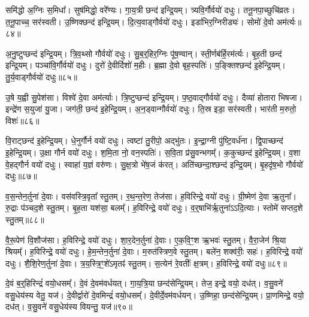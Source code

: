 समि॑द्धो अ॒ग्निः स॒मिधा᳚।
सुष॑मिद्धो॒ वरे᳚ण्यः।
गा॒य॒त्री छन्द॑ इन्द्रि॒यम्।
त्र्यवि॒र्गौर्वयो॑ दधुः।
तनू॒नपा॒च्छुचि॑व्रतः।
त॒नू॒पाच्च॒ सर॑स्वती।
उ॒ष्णिक्छन्द॑ इन्द्रि॒यम्।
दि॒त्य॒वाड्गौर्वयो॑ दधुः।
इडा॑भिर॒ग्निरीड्यः॑।
सोमो॑ दे॒वो अम॑र्त्यः॥८४॥\ip

अ॒नु॒ष्टुप्छन्द॑ इन्द्रि॒यम्।
त्रि॒व॒थ्सो गौर्वयो॑ दधुः।
सु॒ब॒र्॒हिर॒ग्निः पू॑ष॒ण्वान्।
स्ती॒र्णब॑र्हि॒रम॑र्त्यः।
बृ॒ह॒ती छन्द॑ इन्द्रि॒यम्।
पञ्चा॑वि॒र्गौर्वयो॑ दधुः।
दुरो॑ दे॒वीर्दिशो॑ म॒हीः।
ब्र॒ह्मा दे॒वो बृह॒स्पतिः॑।
प॒ङ्क्तिश्छन्द॑ इ॒हेन्द्रि॒यम्।
तु॒र्य॒वाड्गौर्वयो॑ दधुः॥८५॥\ip

उ॒षे य॒ह्वी सु॒पेश॑सा।
विश्वे॑ दे॒वा अम॑र्त्याः।
त्रि॒ष्टुप्छन्द॑ इन्द्रि॒यम्।
प॒ष्ठ॒वाद्गौर्वयो॑ दधुः।
दैव्या॑ होतारा भिषजा।
इन्द्रे॑ण स॒युजा॑ यु॒जा।
जग॑ती॒ छन्द॑ इ॒हेन्द्रि॒यम्।
अ॒न॒ड्वान्गौर्वयो॑ दधुः।
ति॒स्र इडा॒ सर॑स्वती।
भार॑ती म॒रुतो॒ विशः॑॥८६॥\ip

वि॒राट्छन्द॑ इ॒हेन्द्रि॒यम्।
धे॒नुर्गौर्न वयो॑ दधुः।
त्वष्टा॑ तु॒रीपो॒ अद्भु॑तः।
इ॒न्द्रा॒ग्नी पु॑ष्टि॒वर्ध॑ना।
द्वि॒पाच्छन्द॑ इ॒हेन्द्रि॒यम्।
उ॒क्षा गौर्न वयो॑ दधुः।
श॒मि॒ता नो॒ वन॒स्पतिः॑।
स॒वि॒ता प्र॑सु॒वन्भगम्᳚।
क॒कुच्छन्द॑ इ॒हेन्द्रि॒यम्।
व॒शा वे॒हद्गौर्न वयो॑ दधुः।
स्वाहा॑ य॒ज्ञं वरु॑णः।
सु॒क्ष॒त्रो भे॑ष॒जं क॑रत्।
अति॑च्छन्दा॒श्छन्द॑ इन्द्रि॒यम्।
बृ॒हदृ॑ष॒भो गौर्वयो॑ दधुः॥८७॥\ip\anuvakamend[अम॑र्त्यस्तुर्य॒वाड्गौर्वयो॑ दधु॒र्विशो॑ व॒शा वे॒हद्गौर्न वयो॑ दधुश्च॒त्वारि॑ च]

व॒स॒न्तेन॒र्तुना॑ दे॒वाः।
वस॑वस्त्रि॒वृता᳚ स्तु॒तम्।
र॒थ॒न्त॒रेण॒ तेज॑सा।
ह॒विरिन्द्रे॒ वयो॑ दधुः।
ग्री॒ष्मेण॑ दे॒वा ऋ॒तुना᳚।
रु॒द्राः प॑ञ्चद॒शे स्तु॒तम्।
बृ॒ह॒ता यश॑सा॒ बलम्᳚।
ह॒विरिन्द्रे॒ वयो॑ दधुः।
व॒र्॒षाभि॑र्\mbox{}ऋ॒तुना॑\-ऽऽदि॒त्याः।
स्तोमे॑ सप्तद॒शे स्तु॒तम्॥८८॥\ip

वै॒रू॒पेण॑ वि॒शौज॑सा।
ह॒विरिन्द्रे॒ वयो॑ दधुः।
शा॒र॒देन॒र्तुना॑ दे॒वाः।
ए॒क॒वि॒ꣳ॒श ऋ॒भवः॑ स्तु॒तम्।
वै॒रा॒जेन॑ श्रि॒या श्रियम्᳚।
ह॒विरिन्द्रे॒ वयो॑ दधुः।
हे॒म॒न्तेन॒र्तुना॑ दे॒वाः।
म॒रुत॑स्त्रिण॒वे स्तु॒तम्।
बले॑न॒ शक्व॑रीः॒ सहः॑।
ह॒विरिन्द्रे॒ वयो॑ दधुः।
शै॒शि॒रेण॒र्तुना॑ दे॒वाः।
त्र॒य॒स्त्रि॒ꣳ॒शे॑\-ऽमृतꣴ॑ स्तु॒तम्।
स॒त्येन॑ रे॒वतीः᳚ क्ष॒त्रम्।
ह॒विरिन्द्रे॒ वयो॑ दधुः॥८९॥\ip\anuvakamend[स्तोमे॑ सप्तद॒शे स्तु॒तꣳ सहो॑ ह॒विरिन्द्रे॒ वयो॑ दधुश्च॒त्वारि॑ च (व॒स॒न्तेन॑ ग्री॒ष्मेण॑ व॒र्‌॒\mbox{}षाभिः॑ शार॒देन॑ हेम॒न्तेन॑ शैशि॒रेण॒ षट्॥)]

दे॒वं ब॒र्॒हिरिन्द्रं॑ वयो॒धसम्᳚।
दे॒वं दे॒वम॑वर्धयत्।
गा॒य॒त्रि॒या छन्द॑सेन्द्रि॒यम्।
तेज॒ इन्द्रे॒ वयो॒ दध॑त्।
व॒सु॒वने॑ वसु॒धेय॑स्य वेतु॒ यज॑।
दे॒वीर्द्वारो॑ दे॒वमिन्द्रं॑ वयो॒धसम्᳚।
दे॒वीर्दे॒वम॑वर्धयन्।
उ॒ष्णिहा॒ छन्द॑सेन्द्रि॒यम्।
प्रा॒णमिन्द्रे॒ वयो॒ दध॑त्।
व॒सु॒वने॑ वसु॒धेय॑स्य वियन्तु॒ यज॑॥९०॥\ip


